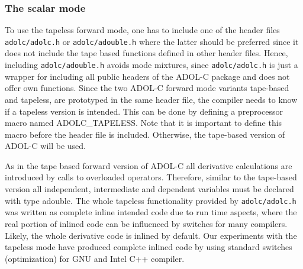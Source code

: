 \documentclass[11pt,twoside]{article}
\begin{document}
\subsubsection*{The scalar mode}
%
To use the tapeless forward mode, one has to include one
of the header files \verb#adolc/adolc.h# or \verb#adolc/adouble.h#
where the latter should be preferred since it does not include the
tape based functions defined in other header files. Hence, including
\verb#adolc/adouble.h# avoids mode mixtures, since
\verb#adolc/adolc.h# is just a wrapper for including all public 
  headers of the ADOL-C package and does not offer own functions. 
Since the two ADOL-C forward mode variants tape-based and tapeless,
are prototyped in the same header file, the compiler needs to know if a
tapeless version is intended. This can be done by defining a
preprocessor macro named {\sf ADOLC\_TAPELESS}. Note that it is 
important to define this macro before the header file is included.
Otherwise, the tape-based version of ADOL-C will be used. 

As in the tape based forward version of ADOL-C all derivative
calculations are introduced by calls to overloaded
operators. Therefore, similar to the tape-based version all
independent, intermediate and dependent variables must be declared 
with type {\sf adouble}. The whole tapeless functionality provided by
\verb#adolc/adolc.h# was written as complete inline intended code
due to run time aspects, where the real portion of inlined code can
be influenced by switches for many compilers. Likely, the whole
derivative code is inlined by default. Our experiments
with the tapeless mode have produced complete inlined code by using
standard switches (optimization) for GNU and Intel C++
compiler.
\end{document}
